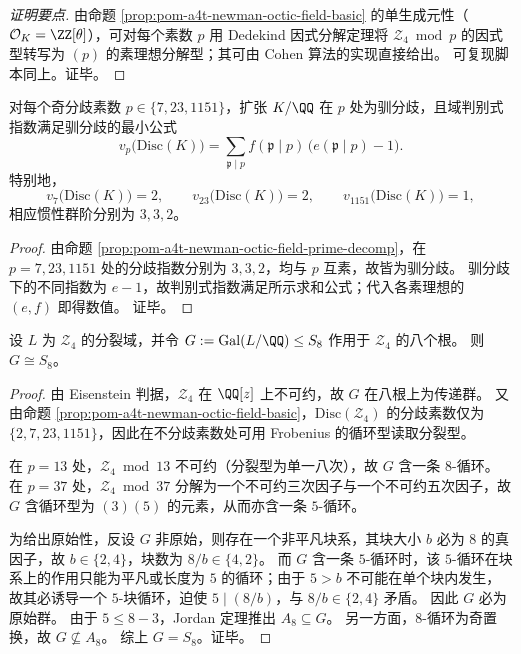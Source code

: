 \begin{proof}[证明要点]
由命题 \ref{prop:pom-a4t-newman-octic-field-basic} 的单生成元性（\(\mathcal O_K=\ZZ[\theta]\)），可对每个素数 \(p\) 用 Dedekind 因式分解定理将 \(\mathcal Z_4\bmod p\) 的因式型转写为 \((p)\) 的素理想分解型；其可由 Cohen 算法的实现直接给出。
可复现脚本同上。证毕。
\end{proof}

\begin{corollary}[奇分歧素数处的纯驯分歧与判别式指数]\label{cor:pom-a4t-newman-octic-field-tame}
对每个奇分歧素数 \(p\in\{7,23,1151\}\)，扩张 \(K/\QQ\) 在 \(p\) 处为驯分歧，且域判别式指数满足驯分歧的最小公式
\[
v_p\!\bigl(\mathrm{Disc}(K)\bigr)=\sum_{\mathfrak p\mid p} f(\mathfrak p\mid p)\,\bigl(e(\mathfrak p\mid p)-1\bigr).
\]
特别地，
\[
v_7\!\bigl(\mathrm{Disc}(K)\bigr)=2,\qquad v_{23}\!\bigl(\mathrm{Disc}(K)\bigr)=2,\qquad v_{1151}\!\bigl(\mathrm{Disc}(K)\bigr)=1,
\]
相应惯性群阶分别为 \(3,3,2\)。
\end{corollary}
\begin{proof}
由命题 \ref{prop:pom-a4t-newman-octic-field-prime-decomp}，在 \(p=7,23,1151\) 处的分歧指数分别为 \(3,3,2\)，均与 \(p\) 互素，故皆为驯分歧。
驯分歧下的不同指数为 \(e-1\)，故判别式指数满足所示求和公式；代入各素理想的 \((e,f)\) 即得数值。
证毕。
\end{proof}

\begin{proposition}\label{prop:pom-a4t-newman-octic-field-galois-s8}
设 \(L\) 为 \(\mathcal Z_4\) 的分裂域，并令 \(G:=\mathrm{Gal}(L/\QQ)\le S_8\) 作用于 \(\mathcal Z_4\) 的八个根。
则 \(G\cong S_8\)。
\end{proposition}
\begin{proof}
由 Eisenstein 判据，\(\mathcal Z_4\) 在 \(\QQ[z]\) 上不可约，故 \(G\) 在八根上为传递群。
又由命题 \ref{prop:pom-a4t-newman-octic-field-basic}，\(\mathrm{Disc}(\mathcal Z_4)\) 的分歧素数仅为 \(\{2,7,23,1151\}\)，因此在不分歧素数处可用 Frobenius 的循环型读取分裂型。
\par
在 \(p=13\) 处，\(\mathcal Z_4\bmod 13\) 不可约（分裂型为单一八次），故 \(G\) 含一条 \(8\)-循环。
在 \(p=37\) 处，\(\mathcal Z_4\bmod 37\) 分解为一个不可约三次因子与一个不可约五次因子，故 \(G\) 含循环型为 \((3)(5)\) 的元素，从而亦含一条 \(5\)-循环。
\par
为给出原始性，反设 \(G\) 非原始，则存在一个非平凡块系，其块大小 \(b\) 必为 \(8\) 的真因子，故 \(b\in\{2,4\}\)，块数为 \(8/b\in\{4,2\}\)。
而 \(G\) 含一条 \(5\)-循环时，该 \(5\)-循环在块系上的作用只能为平凡或长度为 \(5\) 的循环；由于 \(5>b\) 不可能在单个块内发生，故其必诱导一个 \(5\)-块循环，迫使 \(5\mid (8/b)\)，与 \(8/b\in\{2,4\}\) 矛盾。
因此 \(G\) 必为原始群。
由于 \(5\le 8-3\)，Jordan 定理推出 \(A_8\subseteq G\)。
另一方面，\(8\)-循环为奇置换，故 \(G\not\subseteq A_8\)。
综上 \(G=S_8\)。证毕。
\end{proof}


